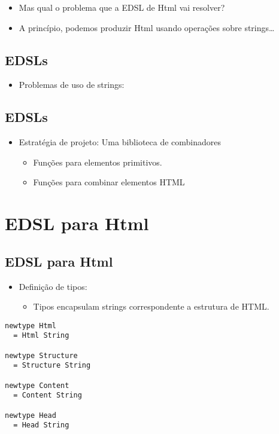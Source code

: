 \documentclass[11pt]{article}
\begin{document}
\begin{itemize}
\item Mas qual o problema que a EDSL de Html vai resolver?

\item A princípio, podemos produzir Html usando operações sobre strings\ldots{}
\end{itemize}
\subsection*{EDSLs}
\label{sec:org024679f}

\begin{itemize}
\item Problemas de uso de strings: 
\end{itemize}
\subsection*{EDSLs}
\label{sec:org0d9d66b}

\begin{itemize}
\item Estratégia de projeto: Uma biblioteca de combinadores
\begin{itemize}
\item Funções para elementos primitivos.
\item Funções para combinar elementos HTML
\end{itemize}
\end{itemize}
\section*{EDSL para Html}
\label{sec:org3d8a48e}

\subsection*{EDSL para Html}
\label{sec:orgce9d56f}

\begin{itemize}
\item Definição de tipos:
\begin{itemize}
\item Tipos encapsulam strings correspondente a estrutura de HTML.
\end{itemize}
\end{itemize}
\begin{verbatim}
newtype Html
  = Html String

newtype Structure
  = Structure String

newtype Content
  = Content String

newtype Head
  = Head String
\end{verbatim}
\end{document}
